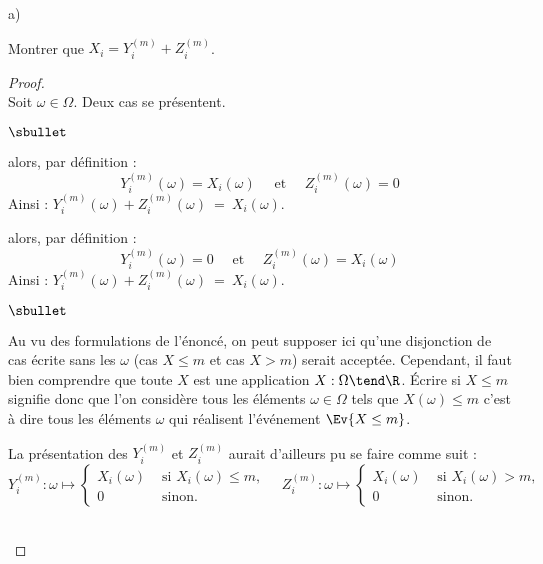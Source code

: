 \begin{liste}{a)}
  \setlength{\itemsep}{2mm}
\item Montrer que $X_{i} = Y_{i}^{(m)} + Z_{i}^{(m)}$.
  
  \begin{proof}~\\%
    Soit $\omega \in \Omega$. Deux cas se présentent.
    \begin{noliste}{$\sbullet$}
    \item {} alors, par définition :
      \[
      Y_{i}^{(m)}(\omega) = X_i(\omega) \quad \text{ et } \quad
      Z_{i}^{(m)}(\omega) = 0
      \]
      Ainsi : $Y_{i}^{(m)}(\omega) + Z_{i}^{(m)}(\omega) \ = \
      X_i(\omega)$.


      \newpage


    \item {} alors, par définition :
      \[
      Y_{i}^{(m)}(\omega) = 0 \quad \text{ et } \quad Z_{i}^{(m)}(\omega) =
      X_i(\omega)
      \]
      Ainsi : $Y_{i}^{(m)}(\omega) + Z_{i}^{(m)}(\omega) \ = \
      X_i(\omega)$.
    \end{noliste}
    \begin{remark}%
      \begin{noliste}{$\sbullet$}
      \item Au vu des formulations de l'énoncé, on peut supposer ici
        qu'une disjonction de cas écrite sans les $\omega$ (cas $X
        \leq m$ et cas $X > m$) serait acceptée. Cependant, il faut
        bien comprendre que toute \var $X$ est une application $X :
        \Omega \tend \R$. Écrire \og si $X \leq m$ \fg{} signifie donc
        que l'on considère tous les éléments $\omega \in \Omega$ tels
        que $X(\omega) \leq m$ c'est à dire tous les éléments $\omega$
        qui réalisent l'événement $\Ev{X \leq m}$.
      \item La présentation des \var $Y_{i}^{(m)}$ et $Z_{i}^{(m)}$
        aurait d'ailleurs pu se faire comme suit :
        \[
        Y_{i}^{(m)} : \omega \mapsto \left\{
          \begin{array}{cl}
            X_{i}(\omega) & \text{ si } X_{i}(\omega) \leq m, \\
            0 & \text{ sinon}.
          \end{array}
        \right. %
        \quad %
        Z_{i}^{(m)} : \omega \mapsto %
        \left\{
          \begin{array}{cl}
            X_{i}(\omega) & \text{ si } X_{i}(\omega) > m, \\
            0 & \text{ sinon}.
          \end{array}
        \right.
        \]
      \end{noliste}
    \end{remark}~\\[-1.4cm]
  \end{proof}

\item ~\\[-1.15cm]
\end{liste}
